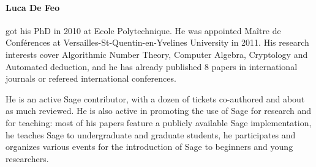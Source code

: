 \paragraph{Luca De Feo} got his PhD in 2010 at Ecole Polytechnique. He
was appointed Maître de Conférences at
Versailles-St-Quentin-en-Yvelines University in 2011. His research
interests cover Algorithmic Number Theory, Computer Algebra,
Cryptology and Automated deduction, and he has already published 8
papers in international journals or refereed international
conferences.

He is an active Sage contributor, with a dozen of tickets co-authored
and about as much reviewed. He is also active in promoting the use of
Sage for research and for teaching: most of his papers feature a
publicly available Sage implementation, he teaches Sage to
undergraduate and graduate students, he participates and organizes
various events for the introduction of Sage to beginners and young
researchers.

